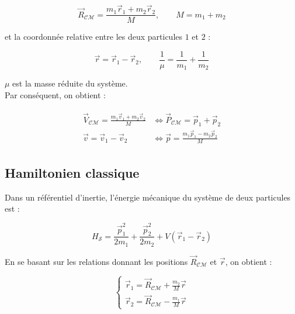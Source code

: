 \documentclass[12pt,a4paper,oneside,french]{book}
\theoremstyle{definition}
\theoremstyle{definition}
\theoremstyle{definition}
\theoremstyle{remark}
\theoremstyle{definition}
\begin{document}
    \begin{equation*}
        {\vec{R}}_{\mathcal{CM}} = \frac{{m}_{1} {\vec{r}}_{1} + {m}_{2} {\vec{r}}_{2}}{M}, \qquad M = {m}_{1} + {m}_{2}
    \end{equation*}
    
    et la coordonnée relative entre les deux particules $1$ et $2$ :
    
    \begin{equation*}
        \vec{r} = {\vec{r}}_{1} - {\vec{r}}_{2}, \qquad \frac{1}{\mu} = \frac{1}{{m}_{1}} + \frac{1}{{m}_{2}}
    \end{equation*}
    
    $\mu$ est la masse réduite du système. \\
    
    Par conséquent, on obtient :
    
    \begin{align*}
    \begin{split}
        {\vec{V}}_{\mathcal{CM}} = \frac{{m}_{1} {\vec{v}}_{1} + {m}_{2} {\vec{v}}_{2}}{M} 
            &\iff {\vec{P}}_{\mathcal{CM}} = {\vec{p}}_{1} + {\vec{p}}_{2} \\
        \vec{v} = {\vec{v}}_{1} - {\vec{v}}_{2} 
            &\iff \vec{p} = \frac{{m}_{1} {\vec{p}}_{1} - {m}_{2} {\vec{p}}_{2}}{M}
    \end{split} 
    \end{align*}
    
    \subsection{Hamiltonien classique}
    Dans un référentiel d'inertie, l'énergie mécanique du système de deux particules est :
    
    \begin{equation*}
        {H}_{\mathcal{S}} = \frac{{\vec{p}}_{1}^{2}}{2 {m}_{1}} + \frac{{\vec{p}}_{2}^{2}}{2 {m}_{2}} + V({\vec{r}}_{1} - {\vec{r}}_{2})
    \end{equation*}
    
    En se basant sur les relations donnant les positions ${\vec{R}}_{\mathcal{CM}}$ et $\vec{r}$, on obtient :
    
    \begin{equation*}
    \begin{cases}
        {\vec{r}}_{1} = {\vec{R}}_{\mathcal{CM}} + \frac{{m}_{2}}{M} \vec{r} \\
        {\vec{r}}_{2} = {\vec{R}}_{\mathcal{CM}} - \frac{{m}_{1}}{M} \vec{r}
    \end{cases}
    \end{equation*}
    
\end{document}
